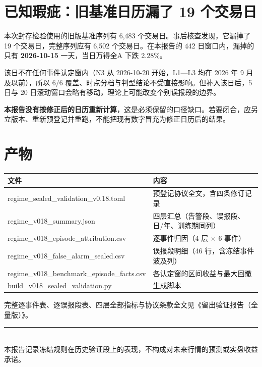 \documentclass[12pt,a4paper]{ctexart}
\begin{document}
\section{已知瑕疵：旧基准日历漏了 19 个交易日}

本次封存检验使用的旧版基准序列有 6,483 个交易日。事后核查发现，它漏掉了 19 个交易日，完整序列应有 6,502 个交易日。在本报告的 442 日窗口内，漏掉的只有 \textbf{2026-10-15} 一天，当日万得全A 下跌 2.28\%。

该日不在任何事件认定窗内（N3 从 2026-10-20 开始，L1—L3 均在 2026 年 9 月及以前），所以 6/6 覆盖、时点分档与判型结论不受直接影响。但补入该日后，5 日与 20 日滚动窗口会略有移动，理论上可能改变个别误报段的边界。

\textbf{本报告没有按修正后的日历重新计算}，这是必须保留的口径缺口。若要闭合，应另立版本、重新预登记并重跑，不能把现有数字冒充为修正日历后的结果。

\section{产物}

\begin{center}\footnotesize
\begin{tabularx}{\textwidth}{@{}>{\raggedright\arraybackslash}p{6.3cm}Y@{}}
\toprule
\textbf{文件} & \textbf{内容} \\
\midrule
regime\_\hspace{0pt}sealed\_\hspace{0pt}validation\_\hspace{0pt}v0.18.toml & 预登记协议全文，含四条修订记录 \\
regime\_\hspace{0pt}v018\_\hspace{0pt}summary.json & 四层汇总（告警段、误报段、日/年、训练期同列）\\
regime\_\hspace{0pt}v018\_\hspace{0pt}episode\_\hspace{0pt}attribution.csv & 逐事件归因（4 层 $\times$ 6 事件）\\
regime\_\hspace{0pt}v018\_\hspace{0pt}false\_\hspace{0pt}alarm\_\hspace{0pt}sealed.csv & 误报段明细（46 行，含冻结事件波及列）\\
regime\_\hspace{0pt}v018\_\hspace{0pt}benchmark\_\hspace{0pt}episode\_\hspace{0pt}facts.csv & 各认定窗的区间收益与最大回撤 \\
build\_\hspace{0pt}v018\_\hspace{0pt}sealed\_\hspace{0pt}validation.py & 生成脚本 \\
\bottomrule
\end{tabularx}
\end{center}

完整逐事件表、逐误报段表、四层全部指标与协议条款全文见《留出验证报告（全量版）》。

\vspace{1.2em}
\begin{center}\small
\rule{0.6\textwidth}{0.4pt}\\[0.4em]
本报告记录冻结规则在历史验证段上的表现，不构成对未来行情的预测或实盘收益承诺。
\end{center}
\end{document}
